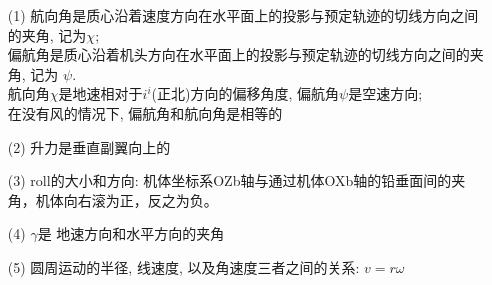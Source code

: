 \begin{itemize}
    \item[(1)] 航向角是质心沿着速度方向在水平面上的投影与预定轨迹的切线方向之间的夹角, 记为$\chi$; \\ 偏航角是质心沿着机头方向在水平面上的投影与预定轨迹的切线方向之间的夹角, 记为 $\psi$.\\
    航向角$\chi$是地速相对于$i^{i}$(正北)方向的偏移角度, 偏航角$\psi$是空速方向; \\在没有风的情况下, 偏航角和航向角是相等的
    \item[(2)] 升力是垂直副翼向上的
    \item[(3)] roll的大小和方向: 机体坐标系OZb轴与通过机体OXb轴的铅垂面间的夹角，机体向右滚为正，反之为负。
    \item[(4)] $\gamma$是 地速方向和水平方向的夹角
    \item[(5)] 圆周运动的半径, 线速度, 以及角速度三者之间的关系: $v = r \omega$
\end{itemize}
\clearpage
